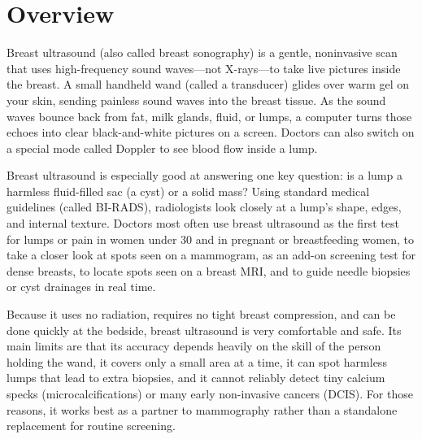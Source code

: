 \label{ch:infographic-breast-ultrasound}

\section{Overview}

Breast ultrasound (also called breast sonography) is a gentle, noninvasive scan that uses high-frequency sound waves---not X-rays---to take live pictures inside the breast. A small handheld wand (called a transducer) glides over warm gel on your skin, sending painless sound waves into the breast tissue. As the sound waves bounce back from fat, milk glands, fluid, or lumps, a computer turns those echoes into clear black-and-white pictures on a screen. Doctors can also switch on a special mode called Doppler to see blood flow inside a lump.

Breast ultrasound is especially good at answering one key question: is a lump a harmless fluid-filled sac (a cyst) or a solid mass? Using standard medical guidelines (called BI-RADS), radiologists look closely at a lump's shape, edges, and internal texture. Doctors most often use breast ultrasound as the first test for lumps or pain in women under 30 and in pregnant or breastfeeding women, to take a closer look at spots seen on a mammogram, as an add-on screening test for dense breasts, to locate spots seen on a breast MRI, and to guide needle biopsies or cyst drainages in real time.

Because it uses no radiation, requires no tight breast compression, and can be done quickly at the bedside, breast ultrasound is very comfortable and safe. Its main limits are that its accuracy depends heavily on the skill of the person holding the wand, it covers only a small area at a time, it can spot harmless lumps that lead to extra biopsies, and it cannot reliably detect tiny calcium specks (microcalcifications) or many early non-invasive cancers (DCIS). For those reasons, it works best as a partner to mammography rather than a standalone replacement for routine screening.

